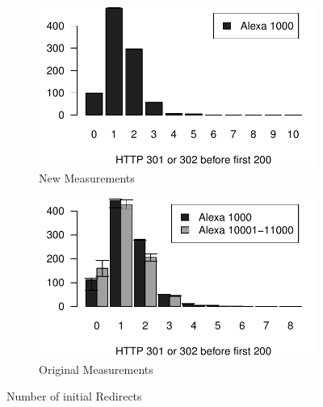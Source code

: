  \begin{figure}
 \centering
 \begin{subfigure}{\linewidth}
		\includegraphics[width=\linewidth]{New_Plots/barplot_redirects_clean.pdf}
	\caption{New Measurements}
	\label{fig:new_bar_redirects}
\end{subfigure}\par\medskip
\begin{subfigure}{\linewidth}
		\includegraphics[width=\linewidth]{Original Plots/barplot_redirects.pdf}
	\caption{Original Measurements}
	\label{fig:orig_bar_redirects}
\end{subfigure}
\caption{Number of initial Redirects}
\label{fig:bar_redirects}
\end{figure}

